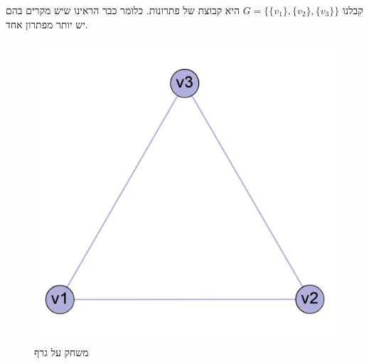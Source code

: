 \documentclass[12pt,leqno]{article}
\theoremstyle{theoremdd}
\begin{document}
קבלנו 
$G = \{\{v_1\}, \{v_2\}, \{v_3\} \}$
היא קבוצת של פתרונות.
כלומר כבר הראינו שיש מקרים בהם יש יותר מפתרון אחד.
\begin{figure}[ht]
    \caption{משחק על גרף}
    \label{fig: clic 3 node graph game} 
    \centering
    \includegraphics[width=.3\textwidth,keepaspectratio]{images/clic_graph_3_node.png}
\end{figure}
\end{document}
